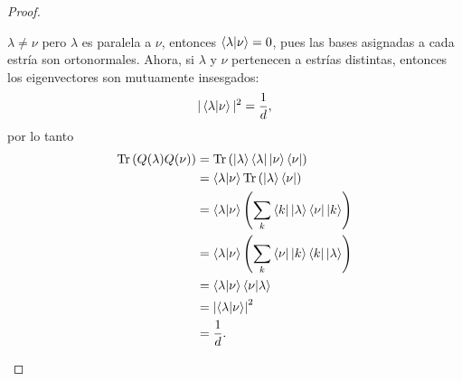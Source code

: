 \documentclass[a4paper]{report}
\DeclareMathOperator{\Tr}{Tr}
\begin{document}
\begin{proof}
\begin{enumerate}
        $\lambda \neq \nu$ pero $\lambda$ es paralela a
        $\nu$, entonces $\braket{\lambda|\nu} = 0$, pues las
        bases asignadas a cada estría son ortonormales.
        Ahora, si $\lambda$ y  $\nu$ pertenecen a estrías
        distintas, entonces los eigenvectores son mutuamente
        insesgados:
        \begin{equation}
          |\braket{\lambda|\nu}|^2
          = \frac{1}{d},
        \end{equation}
        por lo tanto
        \begin{align}
          \Tr\left( Q(\lambda)Q(\nu) \right) 
          &= \Tr\left( \ket{\lambda}\bra{\lambda}
            \ket{\nu}\bra{\nu} \right) \\
          &= \braket{\lambda|\nu} \Tr\left(
            \ket\lambda \bra\nu
          \right) \\
          &= \braket{\lambda|\nu} \left(
            \sum_{k}^{} \bra k \ket
          \lambda \bra \nu \ket k \right) \\
          &= \braket{\lambda|\nu} \left(
            \sum_{k}^{} \bra\nu \ket k
          \bra k \ket \lambda \right) \\
          &= \braket{\lambda|\nu} \braket{\nu|\lambda} \\
          &= \left|\braket{\lambda|\nu}\right|^2 \\
          &= \frac{1}{d}.
        \end{align}


\end{enumerate}
\end{proof}
\end{document}
